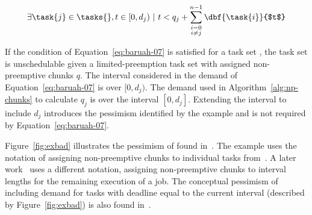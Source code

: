 \begin{definition}
\begin{equation}
  \exists \task{j} \in \tasks{}, t \in [0, d_j) ~|~ t < q_j +
    \sum_{\substack{{i=0}\\{i \not = j}}}^{n - 1}
    \dbf{\task{i}}{$t$}
    \label{eq:baruah-07}
\end{equation}
\end{definition}

If the condition of Equation~\ref{eq:baruah-07} is
satisfied for a task set \tasks{}, the task set is unschedulable given
a limited-preemption task set with assigned non-preemptive chunks
${q}$. The interval considered in the demand of
Equation~\ref{eq:baruah-07} is over ${[0,d_j)}$. The demand used in 
Algorithm~\ref{alg:np-chunks} to calculate ${q_j}$ is over the
interval ${[0, d_j]}$. Extending the interval to include ${d_j}$
introduces the pessimism identified by the example and is not required
by Equation~\ref{eq:baruah-07}.

Figure~\ref{fig:exbad} illustrates the pessimism of
\npchunks{} found in~\cite{Baruah:2005}. The
example uses the notation of assigning non-preemptive chunks to
individual tasks from~\cite{Baruah:2005}. A 
later work~\cite{Bertogna:2010} uses a different notation,
assigning non-preemptive chunks to interval lengths for the remaining
execution of a job. The conceptual pessimism of including demand for
tasks with deadline equal to the current interval (described by
Figure~\ref{fig:exbad}) is also found in~\cite{Bertogna:2010}. 

